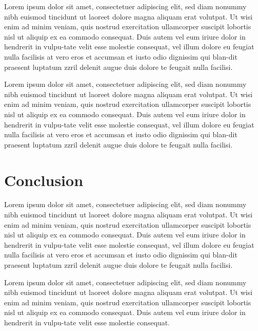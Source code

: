 \documentclass{vgtc}                          %
\begin{document}
Lorem ipsum dolor sit amet, consectetuer adipiscing elit, sed diam nonummy nibh euismod tincidunt ut laoreet dolore magna aliquam erat volutpat. Ut wisi enim ad minim veniam, quis nostrud exercit­ation ullamcorper suscipit lobortis nisl ut aliquip ex ea commodo consequat. Duis autem vel eum iriure dolor in hendrerit in vulpu-tate velit esse molestie consequat, vel illum dolore eu feugiat nulla facilisis at vero eros et accumsan et iusto odio dignissim qui blan-dit praesent luptatum zzril delenit augue duis dolore te feugait nulla facilisi.

Lorem ipsum dolor sit amet, consectetuer adipiscing elit, sed diam nonummy nibh euismod tincidunt ut laoreet dolore magna aliquam erat volutpat. Ut wisi enim ad minim veniam, quis nostrud exercit­ation ullamcorper suscipit lobortis nisl ut aliquip ex ea commodo consequat. Duis autem vel eum iriure dolor in hendrerit in vulpu-tate velit esse molestie consequat, vel illum dolore eu feugiat nulla facilisis at vero eros et accumsan et iusto odio dignissim qui blan-dit praesent luptatum zzril delenit augue duis dolore te feugait nulla facilisi.

\section{Conclusion}

Lorem ipsum dolor sit amet, consectetuer adipiscing elit, sed diam nonummy nibh euismod tincidunt ut laoreet dolore magna aliquam erat volutpat. Ut wisi enim ad minim veniam, quis nostrud exercit­ation ullamcorper suscipit lobortis nisl ut aliquip ex ea commodo consequat. Duis autem vel eum iriure dolor in hendrerit in vulpu-tate velit esse molestie consequat, vel illum dolore eu feugiat nulla facilisis at vero eros et accumsan et iusto odio dignissim qui blan-dit praesent luptatum zzril delenit augue duis dolore te feugait nulla facilisi.

Lorem ipsum dolor sit amet, consectetuer adipiscing elit, sed diam nonummy nibh euismod tincidunt ut laoreet dolore magna aliquam erat volutpat. Ut wisi enim ad minim veniam, quis nostrud exercit­ation ullamcorper suscipit lobortis nisl ut aliquip ex ea commodo consequat. Duis autem vel eum iriure dolor in hendrerit in vulpu-tate velit esse molestie consequat.



\end{document}
